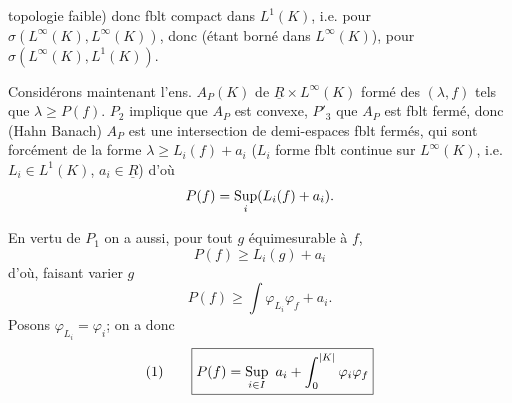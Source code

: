 topologie faible) donc fblt compact dans $L^1(K)$,  i.e.
pour $\sigma(L^{\infty}(K),L^\infty(K))$, donc (étant borné dans $L^\infty(K)$), pour $\sigma(L^\infty(K),L^1(K))$.


Considérons maintenant l'ens. $A_P(K)$ de $\underline{R}\times L^\infty(K)$ formé des $(\lambda,f)$ tels que $\lambda\geq P(f)$.
$P_2$ implique que $A_P$ est convexe, $P'_3$ que $A_P$ est fblt fermé, donc (Hahn Banach) $A_P$ est une intersection de demi-espaces fblt fermés, qui sont forcément de la forme $\lambda\geq L_i(f)+a_i$ ($L_i$ forme fblt continue sur $L^\infty(K)$, i.e. $L_i\in L^1(K)$,  $a_i\in\underline{R}$) d'où
\[
P(f)=\mathop{\rm Sup}_i(L_i(f)+a_i).
\]

En vertu de $P_1$ on a  aussi, pour tout $g$   équimesurable à $f$,
\[
P(f)\geq L_i(g)+a_i
\]
d'où,  faisant varier $g$
\[
P(f)\geq\int\varphi_{L_i}\varphi_f+a_i.
\]
Posons $\varphi_{L_i}=\varphi_i$; on a donc
\[
(1)\qquad \boxed{P(f)=\mathop{\rm Sup}_{i\in I}\ a_i+\int_0^{|K|}\varphi_i\varphi_f}
\]
